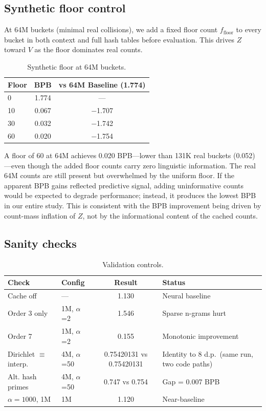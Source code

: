 \documentclass[11pt]{article}
\begin{document}
\subsection{Synthetic floor control}

At 64M buckets (minimal real collisions), we add a fixed floor count $f_{\text{floor}}$ to every bucket in both context and full hash tables before evaluation. This drives $Z$ toward $V$ as the floor dominates real counts.

\begin{table}[h]
\centering
\caption{Synthetic floor at 64M buckets.}
\label{tab:synfloor}
\begin{tabular}{lcc}
\toprule
Floor & BPB & vs 64M Baseline (1.774) \\
\midrule
0 & 1.774 & --- \\
10 & 0.067 & $-$1.707 \\
30 & 0.032 & $-$1.742 \\
60 & 0.020 & $-$1.754 \\
\bottomrule
\end{tabular}
\end{table}

A floor of 60 at 64M achieves 0.020 BPB---lower than 131K real buckets (0.052)---even though the added floor counts carry zero linguistic information. The real 64M counts are still present but overwhelmed by the uniform floor. If the apparent BPB gains reflected predictive signal, adding uninformative counts would be expected to degrade performance; instead, it produces the lowest BPB in our entire study. This is consistent with the BPB improvement being driven by count-mass inflation of $Z$, not by the informational content of the cached counts.

\subsection{Sanity checks}

\begin{table}[h]
\centering
\caption{Validation controls.}
\label{tab:sanity}
\begin{tabular}{llcl}
\toprule
Check & Config & Result & Status \\
\midrule
Cache off & --- & 1.130 & Neural baseline \\
Order 3 only & 1M, $\alpha$=2 & 1.546 & Sparse n-grams hurt \\
Order 7 & 1M, $\alpha$=2 & 0.155 & Monotonic improvement \\
Dirichlet $\equiv$ interp. & 4M, $\alpha$=50 & 0.75420131 vs 0.75420131 & Identity to 8 d.p.\ (same run, two code paths) \\
Alt. hash primes & 4M, $\alpha$=50 & 0.747 vs 0.754 & Gap = 0.007 BPB \\
$\alpha = 1000$, 1M & 1M & 1.120 & Near-baseline \\
\bottomrule
\end{tabular}
\end{table}
\end{document}
